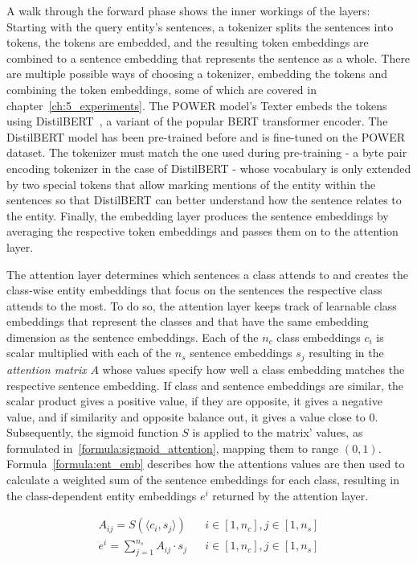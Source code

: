 A walk through the forward phase shows the inner workings of the layers: Starting with the query entity's sentences, a tokenizer splits the sentences into tokens, the tokens are embedded, and the resulting token embeddings are combined to a sentence embedding that represents the sentence as a whole. There are multiple possible ways of choosing a tokenizer, embedding the tokens and combining the token embeddings, some of which are covered in chapter~\ref{ch:5_experiments}. The POWER model's Texter embeds the tokens using DistilBERT~\cite{Sanh2019DistilBERTAD}, a variant of the popular BERT transformer encoder. The DistilBERT model has been pre-trained before and is fine-tuned on the POWER dataset. The tokenizer must match the one used during pre-training - a byte pair encoding tokenizer in the case of DistilBERT - whose vocabulary is only extended by two special tokens that allow marking mentions of the entity within the sentences so that DistilBERT can better understand how the sentence relates to the entity. Finally, the embedding layer produces the sentence embeddings by averaging the respective token embeddings and passes them on to the attention layer.

The attention layer determines which sentences a class attends to and creates the class-wise entity embeddings that focus on the sentences the respective class attends to the most. To do so, the attention layer keeps track of learnable class embeddings that represent the classes and that have the same embedding dimension as the sentence embeddings. Each of the $n_c$ class embeddings $c_i$ is scalar multiplied with each of the $n_s$ sentence embeddings $s_j$ resulting in the \emph{attention matrix} $A$ whose values specify how well a class embedding matches the respective sentence embedding. If class and sentence embeddings are similar, the scalar product gives a positive value, if they are opposite, it gives a negative value, and if similarity and opposite balance out, it gives a value close to 0. Subsequently, the sigmoid function $S$ is applied to the matrix' values, as formulated in~\ref{formula:sigmoid_attention}, mapping them to range $(0, 1)$. Formula~\ref{formula:ent_emb} describes how the attentions values are then used to calculate a weighted sum of the sentence embeddings for each class, resulting in the class-dependent entity embeddings $e^i$ returned by the attention layer.

\begin{align}
    A_{ij} = S(\langle c_i , s_j \rangle) && i \in [1, n_c], j \in [1, n_s]
    \label{formula:sigmoid_attention} \\
    e^i = \sum_{j = 1}^{n_s} A_{ij} \cdot s_j && i \in [1, n_c], j \in [1, n_s]
    \label{formula:ent_emb}
\end{align}

